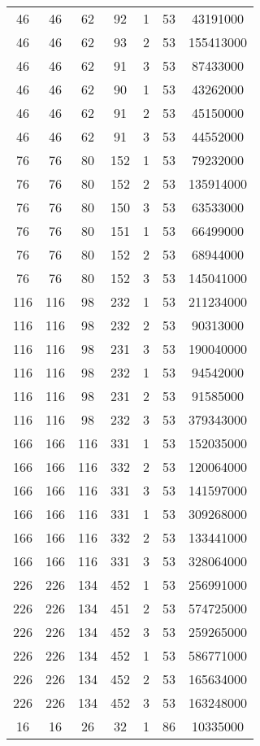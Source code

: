 \documentclass[a4paper,11pt]{article}
\begin{document}
\begin{longtable}{ |c|c|c|c|c|c|c| }
46 & 46 & 62 & 92 & 1 & 53 & 43191000 \\
46 & 46 & 62 & 93 & 2 & 53 & 155413000 \\
46 & 46 & 62 & 91 & 3 & 53 & 87433000 \\
46 & 46 & 62 & 90 & 1 & 53 & 43262000 \\
46 & 46 & 62 & 91 & 2 & 53 & 45150000 \\
46 & 46 & 62 & 91 & 3 & 53 & 44552000 \\
76 & 76 & 80 & 152 & 1 & 53 & 79232000 \\
76 & 76 & 80 & 152 & 2 & 53 & 135914000 \\
76 & 76 & 80 & 150 & 3 & 53 & 63533000 \\
76 & 76 & 80 & 151 & 1 & 53 & 66499000 \\
76 & 76 & 80 & 152 & 2 & 53 & 68944000 \\
76 & 76 & 80 & 152 & 3 & 53 & 145041000 \\
116 & 116 & 98 & 232 & 1 & 53 & 211234000 \\
116 & 116 & 98 & 232 & 2 & 53 & 90313000 \\
116 & 116 & 98 & 231 & 3 & 53 & 190040000 \\
116 & 116 & 98 & 232 & 1 & 53 & 94542000 \\
116 & 116 & 98 & 231 & 2 & 53 & 91585000 \\
116 & 116 & 98 & 232 & 3 & 53 & 379343000 \\
166 & 166 & 116 & 331 & 1 & 53 & 152035000 \\
166 & 166 & 116 & 332 & 2 & 53 & 120064000 \\
166 & 166 & 116 & 331 & 3 & 53 & 141597000 \\
166 & 166 & 116 & 331 & 1 & 53 & 309268000 \\
166 & 166 & 116 & 332 & 2 & 53 & 133441000 \\
166 & 166 & 116 & 331 & 3 & 53 & 328064000 \\
226 & 226 & 134 & 452 & 1 & 53 & 256991000 \\
226 & 226 & 134 & 451 & 2 & 53 & 574725000 \\
226 & 226 & 134 & 452 & 3 & 53 & 259265000 \\
226 & 226 & 134 & 452 & 1 & 53 & 586771000 \\
226 & 226 & 134 & 452 & 2 & 53 & 165634000 \\
226 & 226 & 134 & 452 & 3 & 53 & 163248000 \\
16 & 16 & 26 & 32 & 1 & 86 & 10335000 \\

\end{longtable}
\end{document}
